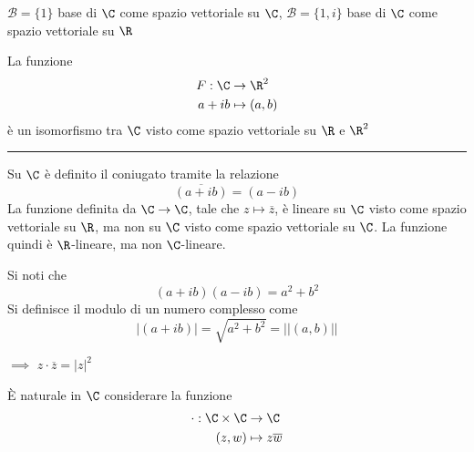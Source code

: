 $ \mathscr{B}=\{1\} $ base di $ \C $ come spazio vettoriale su $ \C $, $ \mathscr{B}=\{1, i\} $ base di $ \C $ come spazio vettoriale su $ \R $

La funzione \begin{align*}
F:\C & \to \R^{2} \\
a+ib & \mapsto (a,b)
\end{align*} è un isomorfismo tra $ \C $ visto come spazio vettoriale su $ \R $ e $ \R^{2} $

\rule{7em}{.4pt}

Su $ \C $ è definito il coniugato tramite la relazione \[
    \overline{(a+ib)}=(a-ib)
\]
La funzione definita da $ \C\to \C $, tale che $ z\mapsto \overline{z} $, è lineare su $ \C  $ visto come spazio vettoriale su $ \R $, ma non su $ \C $ visto come spazio vettoriale su $ \C $. La funzione quindi è $ \R $-lineare, ma non $ \C $-lineare.

Si noti che \[
    (a+ib)(a-ib)=a^{2}+b^{2}
\]
Si definisce il modulo di un numero complesso come \[
    |(a+ib)|=\sqrt{a^{2}+b^{2}}=||(a,b)||
\] 

$\implies$ $ z \cdot \overline{z}=|z|^{2} $

È naturale in $ \C $ considerare la funzione \begin{align*}
\cdot : \C\times\C & \to \C \\
(z,w) & \mapsto z\overline{w}
\end{align*}


